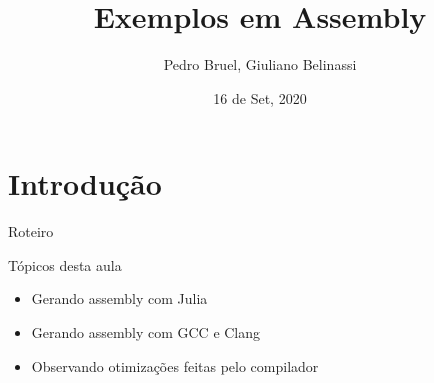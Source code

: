 \documentclass[10pt, compress, aspectratio=169, xcolor={table,usenames,dvipsnames}]{beamer}
\author{ \footnotesize Pedro Bruel, Giuliano Belinassi}
\date{ \scriptsize 16 de Set, 2020}
\title{Exemplos em Assembly}
\begin{document}
\maketitle

\section{Introdução}
\label{sec:orgd46c61e}
\begin{frame}[label={sec:org62c74c6}]{Roteiro}
\begin{block}{Tópicos desta aula}
\begin{itemize}
\item Gerando assembly com Julia
\item Gerando assembly com GCC e Clang
\item Observando otimizações feitas pelo compilador
\end{itemize}
\end{block}
\end{frame}
\end{document}
